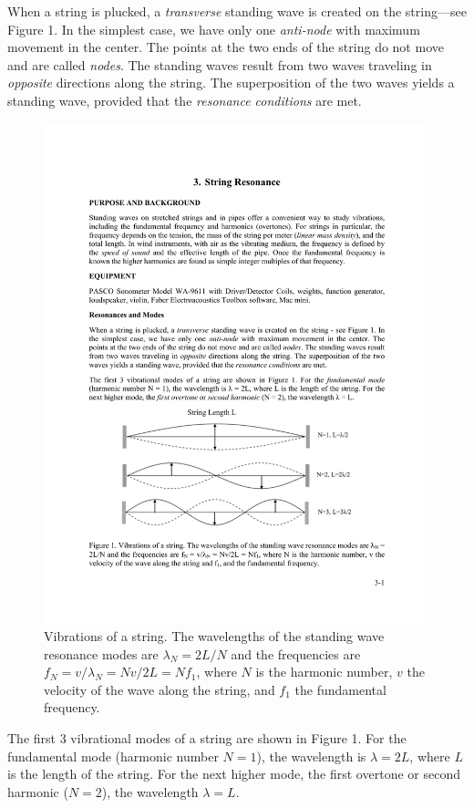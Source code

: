 \documentclass[11pt]{NSF}
\begin{document}
When a string is plucked, a {\em transverse} standing wave is 
created on the string---see Figure 1. 
In the simplest case, we have only one {\em anti-node} with maximum
movement in the center. The points at the two ends of the string do not move
and are called {\em nodes}. 
The standing waves result from two waves traveling in {\em opposite}
directions along the string. The superposition of the two waves yields
a standing wave, provided that the {\em resonance conditions} are met.
%
\begin{figure}[hbtp]
\begin{center}
\includegraphics[width=.85\textwidth]{fig3_1}
\caption{Vibrations of a string. The wavelengths of the standing wave resonance
modes are $\lambda_N = 2L/N$ and the frequencies are 
$f_N = v/\lambda_N = Nv/2L = N f_1$, where $N$ is
the harmonic number, $v$ the velocity of the wave along the string,
and $f_1$ the fundamental frequency.} 
\label{f:1} 
\end{center} 
\end{figure}
%

The first 3 vibrational modes of a string are shown in Figure 1. For the
fundamental mode (harmonic number $N = 1$), the wavelength is 
$\lambda = 2L$, where $L$ is the length of the string. 
For the next higher mode, the first overtone or
second harmonic ($N = 2$), the wavelength $\lambda = L$.
\end{document}
